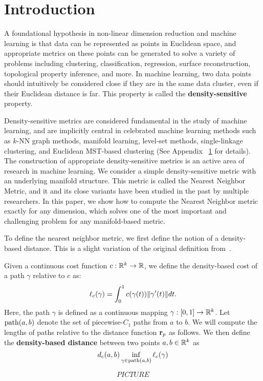 \section{Introduction} A foundational hypothesis in non-linear dimension
reduction and machine learning is that data can be represented as points in
Euclidean space, and appropriate metrics on these points can be generated
to solve a variety of problems including clustering, classification,
regression, surface reconstruction, topological property inference, and
more. In machine learning, two data points should intuitively be considered
close if they are in the same data cluster, even if their Euclidean
distance is far. This property is called the \textbf{density-sensitive}
property.

Density-sensitive metrics are considered fundamental in the study of
machine learning, and are implicitly central in celebrated machine learning
methods such as $k$-NN graph methods, manifold learning, level-set methods,
single-linkage clustering, and Euclidean MST-based clustering (See Appendix
~\ref{} for details). The construction of appropriate density-sensitive
metrics is an active area of research in machine learning. We consider a
simple density-sensitive metric with an underlying manifold structure.
This metric is called the Nearest Neighbor Metric, and it and its close
variants have been studied in the past by multiple researchers. 
In this paper, we show how to
compute the Nearest Neighbor metric exactly for any dimension, which solves
one of the most important and challenging problem for any manifold-based
metric.

To define the nearest neighbor metric, we first define the notion of a
density-based distance. This is a slight variation of the original
definition from~\cite{}.

\begin{definition}
Given a continuous cost function $c:\mathbb{R}^k \rightarrow \mathbb{R}$, we define the density-based
cost of a path $\gamma$ relative to $c$ as: 
\[ \ell_c(\gamma) = \int_{0}^1 c(\gamma(t)) \| \gamma'(t) \|dt. \]
Here, the path $\gamma$ is defined as a continuous mapping $\gamma:[0,1]
\to \mathbb{R}^k$.
Let $\mathrm{path}(a,b)$ denote the set
of piecewise-$C_1$ paths from $a$ to $b$.  We will compute the
lengths of paths relative to the distance function $\mathbf{r}_p$ as
follows. 
We then define the \textbf{density-based distance} between two points $a, b \in
\mathbb{R}^k$ as 
\[ d_c(a,b) \inf_{\gamma\in\mathrm{path}(a,b)} \ell_c(\gamma)\]
\end{definition} $$PICTURE$$

